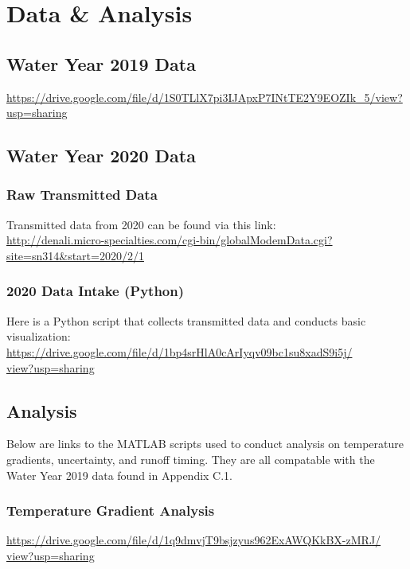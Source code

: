 \chapter{Data \& Analysis} \newpage
\section{Water Year 2019 Data}
\href{https://drive.google.com/file/d/1S0TLlX7pi3IJApxP7INtTE2Y9EOZIk_5/view?usp=sharing}{https://drive.google.com/file/d/1S0TLlX7pi3IJApxP7INtTE2Y9EOZIk\_5/view? \\ usp=sharing}
\section{Water Year 2020 Data}
\subsection{Raw Transmitted Data}
Transmitted data from 2020 can be found via this link: \\
\href{http://denali.micro-specialties.com/cgi-bin/globalModemData.cgi?site=sn314&start=2020/2/1}{http://denali.micro-specialties.com/cgi-bin/globalModemData.cgi? \\ site=sn314&start=2020/2/1} \\ 

\subsection{2020 Data Intake (Python)}
Here is a Python script that collects transmitted data and conducts basic visualization:
\href{https://drive.google.com/file/d/1bp4srHlA0cArIyqv09bc1su8xadS9i5j/view?usp=sharing}{https://drive.google.com/file/d/1bp4srHlA0cArIyqv09bc1su8xadS9i5j/ \\ view?usp=sharing}

\section{Analysis}
Below are links to the MATLAB scripts used to conduct analysis on temperature gradients, uncertainty, and runoff timing. They are all compatable with the Water Year 2019 data found in Appendix C.1. 
\subsection{Temperature Gradient Analysis}
\href{https://drive.google.com/file/d/1q9dmvjT9bsjzyus962ExAWQKkBX-zMRJ/view?usp=sharing}{https://drive.google.com/file/d/1q9dmvjT9bsjzyus962ExAWQKkBX-zMRJ/ \\ view?usp=sharing}
